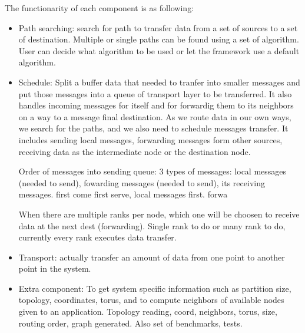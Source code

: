 The functionarity of each component is as following:
\begin{itemize}
\item Path searching: search for path to transfer data from a set of sources to a set of destination. Multiple or single paths can be found using a set of algorithm. User can decide what algorithm to be used or let the framework use a default algorithm.
\item Schedule: Split a buffer data that needed to tranfer into smaller messages and put those messages into a queue of transport layer to be transferred. It also handles incoming messages for itself and for forwardig them to its neighbors on a way to a message final destination.
As we route data in our own ways, we search for the paths, and we also need to schedule messages transfer. It includes sending local messages, forwarding messages form other sources, receiving data as the intermediate node or the destination node.

Order of messages into sending queue: 3 types of messages: local messages (needed to send), fowarding messages (needed to send), its receiving messages. first come first serve, local messages first. forwa

When there are multiple ranks per node, which one will be choosen to receive data at the next dest (forwarding). Single rank to do or many rank to do, currently every rank executes data transfer.

\item Transport: actually transfer an amount of data from one point to another point in the system.
\item Extra component: To get system specific information such as partition size, topology, coordinates, torus, and to compute neighbors of available nodes given to an application. Topology reading, coord, neighbors, torus, size, routing order, graph generated. Also set of benchmarks, tests.
\end{itemize}
